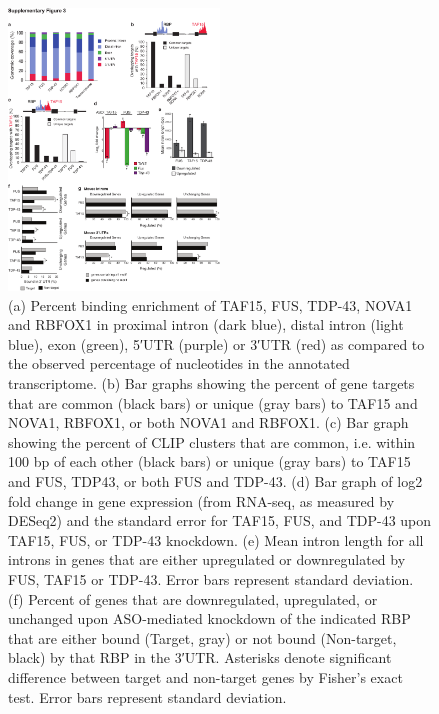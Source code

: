 \begin{figure}[ht]
  \centering
  \includegraphics[width=0.5\textwidth]{chapter_2_figures/Figure_S3}
  \caption[Supplementary Figure 3. TAF15 and FUS exhibit similar RNA interaction in the mouse brain]{(a) Percent binding enrichment of TAF15, FUS, TDP-43, NOVA1 and RBFOX1 in proximal intron (dark blue), distal intron (light blue), exon (green), 5′UTR (purple) or 3′UTR (red) as compared to the observed percentage of nucleotides in the annotated transcriptome. (b) Bar graphs showing the percent of gene targets that are common (black bars) or unique (gray bars) to TAF15 and NOVA1, RBFOX1, or both NOVA1 and RBFOX1. (c) Bar graph showing the percent of CLIP clusters that are common, i.e. within 100 bp of each other (black bars) or unique (gray bars) to TAF15 and FUS, TDP43, or both FUS and TDP-43. (d) Bar graph of log2 fold change in gene expression (from RNA-seq, as measured by DESeq2) and the standard error for TAF15, FUS, and TDP-43 upon TAF15, FUS, or TDP-43 knockdown. (e) Mean intron length for all introns in genes that are either upregulated or downregulated by FUS, TAF15 or TDP-43. Error bars represent standard deviation. (f) Percent of genes that are downregulated, upregulated, or unchanged upon ASO-mediated knockdown of the indicated RBP that are either bound (Target, gray) or not bound (Non-target, black) by that RBP in the 3′UTR. Asterisks denote significant difference between target and non-target genes by Fisher’s exact test. Error bars represent standard deviation.}
  \label{fig:Figure_S3}
\end{figure}

